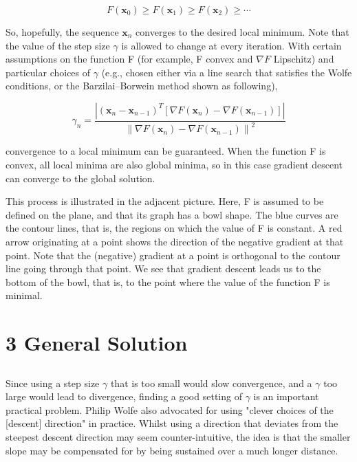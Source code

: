 \documentclass[11pt]{article}
\begin{document}
    \[F(\mathbf {x} _{0})\geq F(\mathbf {x} _{1})\geq F(\mathbf {x} _{2})\geq \cdots\]
    
So, hopefully, the sequence \(\mathbf {x} _{n}\) converges to the desired local minimum. Note that the value of the step size \(\gamma\) is allowed to change at every iteration. With certain assumptions on the function F (for example, F convex and \(\nabla F\) Lipschitz) and particular choices of \(\gamma\) (e.g., chosen either via a line search that satisfies the Wolfe conditions, or the Barzilai–Borwein method shown as following),

    \[\gamma _{n}={\frac {\left|\left(\mathbf {x} _{n}-\mathbf {x} _{n-1}\right)^{T}\left[\nabla F(\mathbf {x} _{n})-\nabla F(\mathbf {x} _{n-1})\right]\right|}{\left\|\nabla F(\mathbf {x} _{n})-\nabla F(\mathbf {x} _{n-1})\right\|^{2}}}\]

convergence to a local minimum can be guaranteed. When the function F is convex, all local minima are also global minima, so in this case gradient descent can converge to the global solution.

This process is illustrated in the adjacent picture. Here, F is assumed to be defined on the plane, and that its graph has a bowl shape. The blue curves are the contour lines, that is, the regions on which the value of F is constant. A red arrow originating at a point shows the direction of the negative gradient at that point. Note that the (negative) gradient at a point is orthogonal to the contour line going through that point. We see that gradient descent leads us to the bottom of the bowl, that is, to the point where the value of the function F is minimal. 
\section*{3 General Solution}
\subsection*{}
Since using a step size \(\gamma\) that is too small would slow convergence, and a \(\gamma\) too large would lead to divergence, finding a good setting of \(\gamma\) is an important practical problem. Philip Wolfe also advocated for using "clever choices of the [descent] direction" in practice. Whilst using a direction that deviates from the steepest descent direction may seem counter-intuitive, the idea is that the smaller slope may be compensated for by being sustained over a much longer distance.
\end{document}
